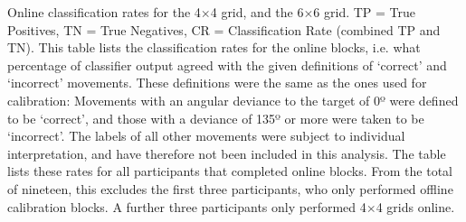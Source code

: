 \begin{table}[hb]
    \caption[Online classification rates for cursor movements on two grid sizes.]]{Online classification rates for the 4$\times$4 grid, and the 6$\times$6  grid. TP = True Positives, TN = True Negatives, CR = Classification Rate (combined TP and TN). This table lists the classification rates for the online blocks, i.e. what percentage of classifier output agreed with the given definitions of `correct' and `incorrect' movements. These definitions were the same as the ones used for calibration: Movements with an angular deviance to the target of 0º were defined to be `correct', and those with a deviance of 135º or more were taken to be `incorrect'. The labels of all other movements were subject to individual interpretation, and have therefore not been included in this analysis. The table lists these rates for all participants that completed online blocks. From the total of nineteen, this excludes the first three participants, who only performed offline calibration blocks. A further three participants only performed 4$\times$4 grids online. }
\end{table}

